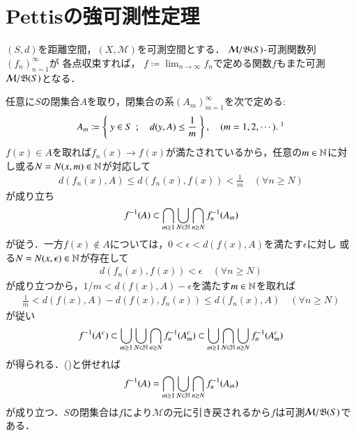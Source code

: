 \section{Pettisの強可測性定理}
	\begin{screen}
		\begin{lem}[距離空間値の可測関数列の各点極限は可測]
			$(S,d)$を距離空間，$(X,\mathcal{M})$を可測空間とする．
			$\mathcal{M}/\mathfrak{B}(S)$-可測関数列$(f_n)_{n=1}^{\infty}$が
			各点収束すれば，
			$f \coloneqq \lim_{n \to \infty} f_n$で定める関数$f$もまた可測$\mathcal{M}/\mathfrak{B}(S)$となる．
			\label{lem:measurability_metric_space}
		\end{lem}
	\end{screen}
	
	\begin{prf}
		任意に$S$の閉集合$A$を取り，閉集合の系$(A_m)_{m=1}^{\infty}$を次で定める:
		\begin{align}
			A_m \coloneqq \Set{y \in S}{d(y,A) \leq \frac{1}{m}}, \quad (m=1,2,\cdots).\ \footnotemark
		\end{align}
		\footnotetext{
			$S \ni y \longmapsto d(y,A) \in [0,\infty)$は連続であるから，
			閉集合$[0,1/m]$は$S$の閉集合に引き戻される．
		}
		$f(x) \in A$を取れば$f_n(x) \longrightarrow f(x)$が満たされているから，任意の$m \in \mathbb{N}$に対し或る$N = N(x,m) \in \mathbb{N}$が対応して
		\begin{align}
			d\left( f_n(x),A \right) \leq d\left( f_n(x),f(x) \right) < \frac{1}{m}
			\quad (\forall n \geq N)
		\end{align}
		が成り立ち
		\begin{align}
			f^{-1}(A) \subset \bigcap_{m \geq 1} \bigcup_{N \in \mathbb{N}} \bigcap_{n \geq N} f_n^{-1}(A_m)
			\label{eq:lem_measurability_metric_space}
		\end{align}
		が従う．一方$f(x) \notin A$については，$0 < \epsilon < d(f(x),A)$を満たす$\epsilon$に対し
		或る$N = N(x,\epsilon) \in \mathbb{N}$が存在して
		\begin{align}
			d\left( f_n(x), f(x) \right) < \epsilon
			\quad (\forall n \geq N)
		\end{align}
		が成り立つから，$1/m < d(f(x),A) - \epsilon$を満たす$m \in \mathbb{N}$を取れば
		\begin{align}
			\frac{1}{m} < d(f(x),A) - d(f(x),f_n(x)) \leq d(f_n(x),A)
			\quad (\forall n \geq N)
		\end{align}
		が従い
		\begin{align}
			f^{-1}(A^c) \subset \bigcup_{m \geq 1} \bigcup_{N \in \mathbb{N}} \bigcap_{n \geq N} f_n^{-1}(A_m^c)
			\subset \bigcup_{m \geq 1} \bigcap_{N \in \mathbb{N}} \bigcup_{n \geq N} f_n^{-1}(A_m^c)
		\end{align}
		が得られる．()と併せれば
		\begin{align}
			f^{-1}(A) = \bigcap_{m \geq 1} \bigcup_{N \in \mathbb{N}} \bigcap_{n \geq N} f_n^{-1}(A_m)
		\end{align}
		が成り立つ．$S$の閉集合は$f$により$\mathcal{M}$の元に引き戻されるから$f$は可測$\mathcal{M}/\mathfrak{B}(S)$である．
		\QED
	\end{prf}
	
